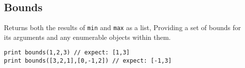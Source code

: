 \hypertarget{bounds}{%
\subsection{Bounds}\label{bounds}}

Returns both the results of \texttt{min} and \texttt{max} as a list,
Providing a set of bounds for its arguments and any enumerable objects
within them.

\begin{lstlisting}
print bounds(1,2,3) // expect: [1,3]
print bounds([3,2,1],[0,-1,2]) // expect: [-1,3]
\end{lstlisting}
